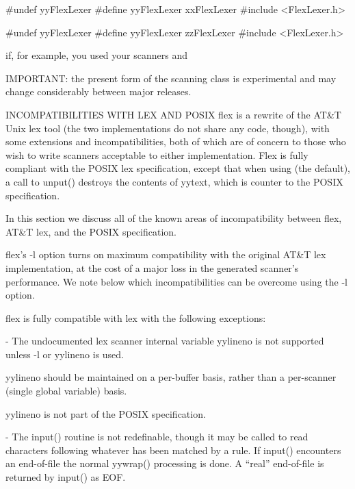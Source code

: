 \documentclass[12pt,spanish,twocolumn,lettersize]{article}
\begin{document}
{	   #undef yyFlexLexer
	   #define yyFlexLexer xxFlexLexer
	   #include <FlexLexer.h>

	   #undef yyFlexLexer
	   #define yyFlexLexer zzFlexLexer
	   #include <FlexLexer.h>

       if, for example, you used %
       your scanners and %

       IMPORTANT:  the	present	 form  of  the	scanning class is
       experimental and may  change  considerably  between  major
       releases.

INCOMPATIBILITIES WITH LEX AND POSIX
       flex  is	 a  rewrite  of	 the  AT&T Unix lex tool (the two
       implementations do not share any code, though), with  some
       extensions  and	incompatibilities,  both  of which are of
       concern to those who wish to write scanners acceptable  to
       either  implementation.	 Flex is fully compliant with the
       POSIX lex specification, except that when  using	 %
       (the  default), a call to unput() destroys the contents of
       yytext, which is counter to the POSIX specification.

       In this section we discuss  all	of  the	 known	areas  of
       incompatibility	between	 flex,	AT&T  lex,  and the POSIX
       specification.

       flex's -l option turns on maximum compatibility	with  the
       original	 AT&T  lex implementation, at the cost of a major
       loss in the  generated  scanner's  performance.	 We  note
       below which incompatibilities can be overcome using the -l
       option.

       flex is fully  compatible  with	lex  with  the	following
       exceptions:

       -      The  undocumented	 lex  scanner  internal	 variable
	      yylineno is not  supported  unless  -l  or  %
	      yylineno is used.

	      yylineno	should	be  maintained	on  a  per-buffer
	      basis, rather than  a  per-scanner  (single  global
	      variable) basis.

	      yylineno is not part of the POSIX specification.

       -      The  input()  routine is not redefinable, though it
	      may be called to read characters following whatever
	      has  been matched by a rule.  If input() encounters
	      an end-of-file the normal	 yywrap()  processing  is
	      done.    A  ``real''  end-of-file	 is  returned  by
	      input() as EOF.

}
\end{document}
